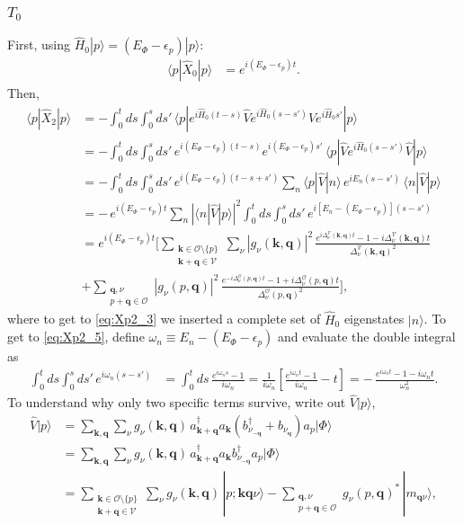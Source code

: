 \subsubsection{$T_0$}
First, using $\hat H_0|p\rangle=(E_\Phi-\epsilon_p)|p\rangle$:
\begin{align}
    \langle p|\hat X_0|p\rangle&=e^{i(E_\Phi-\epsilon_p)t}.
\end{align}
Then,
\begin{align}
\langle p|\hat X_2|p\rangle
&=-\int_0^t\!ds\int_0^s\!ds'\,\langle p|e^{i\hat H_0(t-s)}\hat V e^{i\hat H_0(s-s')}\hat V e^{i\hat H_0s'}|p\rangle\\
&=-\int_0^t\!ds\int_0^s\!ds'\,e^{i(E_\Phi-\epsilon_p)(t-s)}e^{i(E_\Phi-\epsilon_p)s'}\,\langle p|\hat V e^{i\hat H_0(s-s')}\hat V|p\rangle\\
&=-\int_0^t\!ds\int_0^s\!ds'\,e^{i(E_\Phi-\epsilon_p)(t-s+s')}\sum_n\langle p|\hat V|n\rangle\,e^{iE_n(s-s')}\,\langle n|\hat V|p\rangle \label{eq:Xp2_3}\\
&=-\,e^{i(E_\Phi-\epsilon_p)t}\sum_n\left|\langle n|\hat V|p\rangle\right|^2\int_0^t\!ds\int_0^s\!ds'\,e^{i\left[E_n-(E_\Phi-\epsilon_p)\right](s-s')} \\
&=e^{i(E_\Phi-\epsilon_p)t}\Bigg[
\sum_{\substack{\bm k\in\mathcal O\setminus\{p\}\\ \bm k+\bm q\in\mathcal V}}\sum_\nu|g_\nu(\bm k,\bm q)|^2\,
\frac{e^{i\Delta^{\mathcal V}_\nu(\bm k,\bm q)t}-1-i\Delta^{\mathcal V}_\nu(\bm k,\bm q)t}{\Delta^{\mathcal V}_\nu(\bm k,\bm q)^2}\nonumber\\
&+\sum_{\substack{\bm q,\nu\\ p+\bm q\in\mathcal O}}|g_\nu(p,\bm q)|^2\,
\frac{e^{-i\Delta^{\mathcal O}_\nu(p,\bm q)t}-1+i\Delta^{\mathcal O}_\nu(p,\bm q)t}{\Delta^{\mathcal O}_\nu(p,\bm q)^2}\Bigg], \label{eq:Xp2_5}
\end{align}
where to get to \ref{eq:Xp2_3} we inserted a complete set of $\hat H_0$ eigenstates $|n\rangle$. To get to \ref{eq:Xp2_5}, define $\omega_n\equiv E_n-(E_\Phi-\epsilon_p)$ and evaluate the double integral as
\begin{align}
\int_0^t\!ds\int_0^s\!ds'\,e^{i\omega_n(s-s')}
&=\int_0^t\!ds\,\frac{e^{i\omega_ns}-1}{i\omega_n}
=\frac{1}{i\omega_n}\left[\frac{e^{i\omega_nt}-1}{i\omega_n}-t\right]
=-\,\frac{e^{i\omega_nt}-1-i\omega_nt}{\omega_n^2}.
\end{align}
To understand why only two specific terms survive, write out $\hat V|p\rangle$,
\begin{align}
\hat V|p\rangle&=\sum_{\bm k,\bm q}\sum_\nu g_\nu(\bm k,\bm q)\,a^\dagger_{\bm k+\bm q}a_{\bm k}\left(b^\dagger_{\nu_{-\bm q}}+b_{\nu_{\bm q}}\right)a_p|\Phi\rangle\\
&=\sum_{\bm k,\bm q}\sum_\nu g_\nu(\bm k,\bm q)\,a^\dagger_{\bm k+\bm q}a_{\bm k}b^\dagger_{\nu_{-\bm q}}a_p|\Phi\rangle\\
&=\sum_{\substack{\bm k\in\mathcal O\setminus\{p\}\\ \bm k+\bm q\in\mathcal V}}\sum_\nu g_\nu(\bm k,\bm q)\,|p;\bm k\bm q\nu\rangle
-\sum_{\substack{\bm q,\nu\\ p+\bm q\in\mathcal O}}g_\nu(p,\bm q)^*\,|m_{\bm q\nu}\rangle ,
\end{align}
